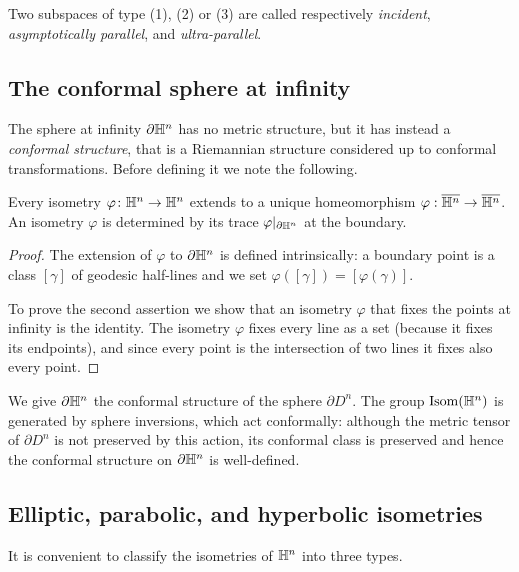 Two subspaces of type (1), (2) or (3) are called respectively \emph{incident}, \emph{asymptotically parallel}, and \emph{ultra-parallel}.

\subsection{The conformal sphere at infinity}
The sphere at infinity $\partial \mathbb{H}^n$ has no metric structure, but it has instead a \emph{conformal structure}, that is a Riemannian structure considered up to conformal transformations. Before defining it we note the following.

\begin{prop}
Every isometry $\varphi \colon \mathbb{H}^n \to \mathbb{H}^n$ extends to a unique homeomorphism $\varphi:\overline{\mathbb{H}^n} \to \overline{\mathbb{H}^n}$. An isometry $\varphi$ is determined by its trace $\varphi|_{\partial \mathbb{H}^n}$ at the boundary.
\end{prop}
\begin{proof}
The extension of $\varphi$ to $\partial \mathbb{H}^n$ is defined intrinsically: a boundary point is a class $[\gamma]$ of geodesic half-lines and we set $\varphi ([\gamma]) = [\varphi(\gamma)]$. 

To prove the second assertion we show that an isometry $\varphi$ that fixes the points at infinity is the identity. The isometry $\varphi$ fixes every line as a set (because it fixes its endpoints), and since every point is the intersection of two lines it fixes also every point.
\end{proof}

We give $\partial \mathbb{H}^n$ the conformal structure of the sphere $\partial D^n$. The group ${\rm Isom}(\mathbb{H}^n)$ is generated by sphere inversions, which act conformally: although the metric tensor of $\partial D^n$ is not preserved by this action, its conformal class is preserved and hence the conformal structure on $\partial \mathbb{H}^n$ is well-defined.

\subsection{Elliptic, parabolic, and hyperbolic isometries}
It is convenient to classify the isometries of $\mathbb{H}^n$ into three types.

